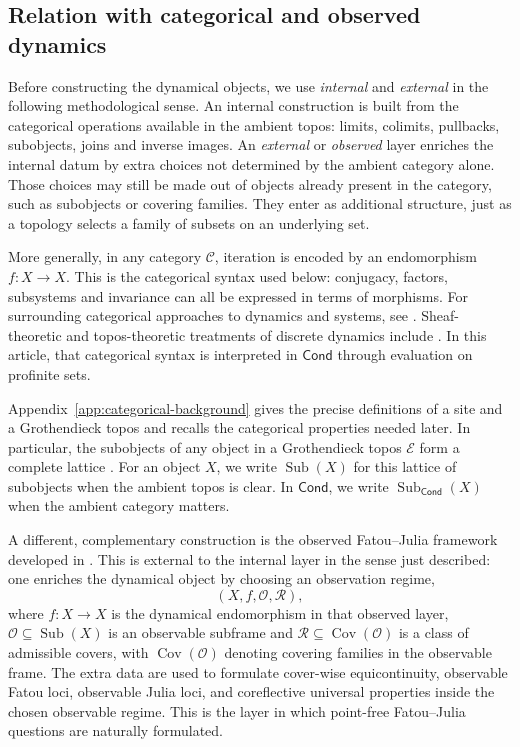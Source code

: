 \documentclass[10pt]{amsart}
\newcommand{\Cond}{\mathsf{Cond}}
\newcommand{\Sub}{\operatorname{Sub}}
\newcommand{\Cov}{\operatorname{Cov}}
\newcommand{\admR}{\mathcal R}
\theoremstyle{plain}
\theoremstyle{definition}
\begin{document}
\subsection{Relation with categorical and observed dynamics}
\label{sec:relation}

Before constructing the dynamical objects, we use \emph{internal} and
\emph{external} in the following methodological sense. An internal construction
is built from the categorical operations available in the
ambient topos: limits, colimits, pullbacks, subobjects, joins and inverse images.
An \emph{external} or \emph{observed} layer enriches the internal
datum by extra choices not determined by the ambient category alone. Those
choices may still be made out of objects already present in the category, such
as subobjects or covering families. They enter as additional structure, just as
a topology selects a family of subsets on an underlying set.

More generally, in any category $\mathcal C$, iteration is encoded by an
endomorphism $f:X\to X$. This is the categorical syntax used below: conjugacy,
factors, subsystems and invariance can all be expressed in terms of morphisms.
For surrounding categorical approaches to dynamics and systems, see
\cite{LawvereToposes,MyersDouble}. Sheaf-theoretic and
topos-theoretic treatments of discrete dynamics include
\cite{SchultzSpivakVasilakopoulou,GarofaliDynamicalSheaves,HoraKamio,RogersTopologicalMonoid}.
In this article, that categorical syntax is interpreted in $\Cond$ through
evaluation on profinite sets.

Appendix~\ref{app:categorical-background} gives the precise definitions of a
site and a Grothendieck topos and recalls the categorical properties needed
later.
In particular, the subobjects of any object in a Grothendieck topos $\mathcal E$
form a complete lattice \cite{MacLaneMoerdijk,JohnstoneTopos}. For an object
$X$, we write $\Sub(X)$ for this lattice of subobjects when the ambient topos is
clear. In $\Cond$, we write $\Sub_{\Cond}(X)$ when the ambient category
matters.

A different, complementary construction is the observed Fatou--Julia framework
developed in \cite{PerezBuendiaFatuTopos}. This is
external to the internal layer in the sense just described: one enriches the
dynamical object by choosing an observation regime,
\[
  (X,f,\mathcal O,\admR),
\]
where $f:X\to X$ is the dynamical endomorphism in that observed layer,
$\mathcal O\subseteq \Sub(X)$ is an observable subframe and
$\admR\subseteq\Cov(\mathcal O)$ is a class of admissible covers, with
$\Cov(\mathcal O)$ denoting covering families in the observable frame. The extra
data are used to formulate cover-wise equicontinuity, observable Fatou loci,
observable Julia loci, and coreflective universal properties inside the chosen
observable regime. This is the layer in which point-free Fatou--Julia questions
are naturally formulated.
\end{document}

